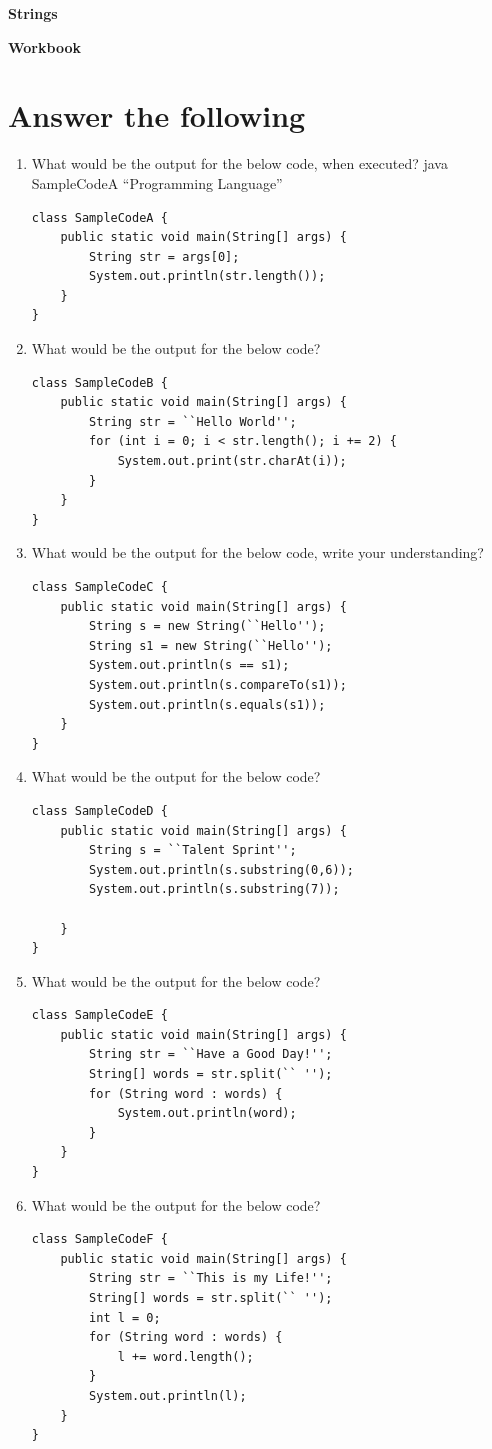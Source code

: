 \documentclass[11pt,a4paper]{article}
\def\AnswerBox{\fbox{\begin{minipage}{4in}\hfill\vspace{0.5in}\end{minipage}}}
\begin{document}
\centerline{\huge{ \textbf{Strings}}}
\vspace{1pc}
\centerline{\Large{ \textbf{Workbook}}}
\section*{Answer the following}
\begin{enumerate}
\item What would be the output for the below code, when executed?
    java SampleCodeA ``Programming Language''
\begin{lstlisting}
class SampleCodeA {
    public static void main(String[] args) {
        String str = args[0];
        System.out.println(str.length());
    }
}
\end{lstlisting}
\AnswerBox
\item What would be the output for the below code?
\begin{lstlisting}
class SampleCodeB {
    public static void main(String[] args) {
        String str = ``Hello World'';
        for (int i = 0; i < str.length(); i += 2) {
            System.out.print(str.charAt(i));
        }
    }
}
\end{lstlisting}
\AnswerBox
\item What would be the output for the below code, write your understanding?
\begin{lstlisting}
class SampleCodeC {
    public static void main(String[] args) {
        String s = new String(``Hello'');
        String s1 = new String(``Hello'');
        System.out.println(s == s1);
        System.out.println(s.compareTo(s1));
        System.out.println(s.equals(s1));
    }
}
\end{lstlisting}
\AnswerBox
\item What would be the output for the below code?
\begin{lstlisting}
class SampleCodeD {
    public static void main(String[] args) {
        String s = ``Talent Sprint'';
        System.out.println(s.substring(0,6));
        System.out.println(s.substring(7));

    }
}
\end{lstlisting}
\AnswerBox
\item What would be the output for the below code?
\begin{lstlisting}
class SampleCodeE {
    public static void main(String[] args) {
        String str = ``Have a Good Day!'';
        String[] words = str.split(`` '');
        for (String word : words) {
            System.out.println(word);
        }
    }
}
\end{lstlisting}
\AnswerBox
\item What would be the output for the below code?
\begin{lstlisting}
class SampleCodeF {
    public static void main(String[] args) {
        String str = ``This is my Life!'';
        String[] words = str.split(`` '');
        int l = 0;
        for (String word : words) {
            l += word.length();
        }
        System.out.println(l);
    }
}
\end{lstlisting}
\AnswerBox
\end{enumerate}
\end{document}
